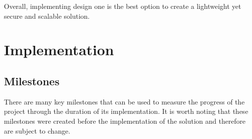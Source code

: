 \documentclass[12pt, conference, final, a4paper, onecolumn, compsoc]{IEEEtran}
\begin{document}
    Overall, implementing design one is the best option to create a lightweight
    yet secure and scalable solution.

    \section{Implementation}


    \subsection*{Milestones} %

    There are many key milestones that can be used to measure the progress of
    the project through the duration of its implementation. It is worth noting
    that these milestones were created before the implementation of the solution
    and therefore are subject to change.
\end{document}
